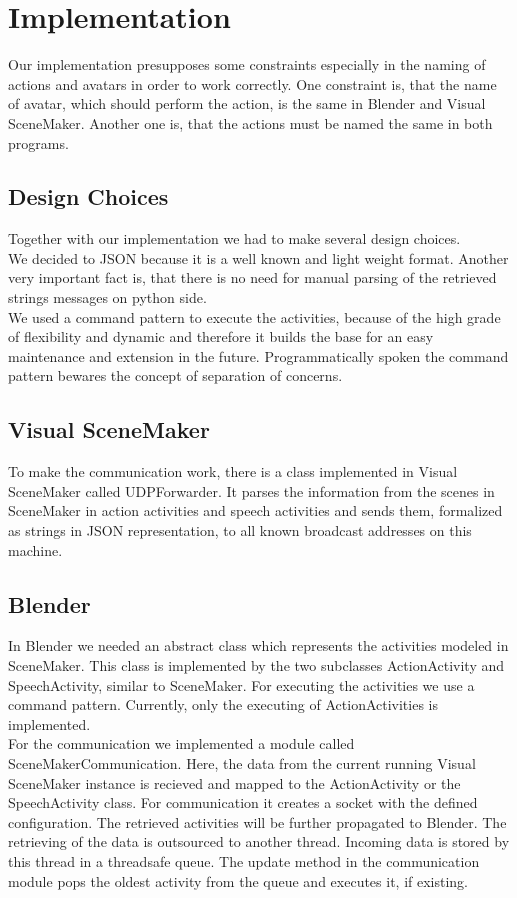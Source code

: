 \documentclass[
10pt, %
a4paper, %
oneside,
headinclude,footinclude, %
BCOR5mm, %
]{scrartcl}
\begin{document}

\section{Implementation}
Our implementation presupposes some constraints especially in the naming of actions and avatars in order to work correctly.
One constraint is, that the name of avatar, which should perform the action, is the same in Blender and Visual SceneMaker. Another one is, that the actions must be named the same in both programs. %

\subsection{Design Choices}
Together with our implementation we had to make several design choices.\\
We decided to JSON because it is a well known and light weight format. Another very important fact is, that there is no need for manual parsing of the retrieved strings messages on python side.\\
We used a command pattern to execute the activities, because of the high grade of flexibility and dynamic and therefore it builds the base for an easy maintenance and extension in the future. Programmatically spoken the command pattern bewares the concept of separation of concerns.

\subsection{Visual SceneMaker}
To make the communication work, there is a class implemented in Visual SceneMaker called UDPForwarder. It parses the information from the scenes in SceneMaker in action activities and speech activities and sends them, formalized as strings in JSON representation, to all known broadcast addresses on this machine. 

\subsection{Blender}
In Blender we needed an abstract class which represents the activities modeled in SceneMaker. This class is implemented by the two subclasses  ActionActivity and SpeechActivity, similar to SceneMaker. For executing the activities we use a command pattern. Currently, only the executing of ActionActivities is implemented.\\
For the communication we implemented a module called SceneMakerCommunication. Here, the data from the current running Visual SceneMaker instance is recieved and mapped to the ActionActivity or the SpeechActivity class. For communication it creates a socket with the defined configuration. The retrieved
activities will be further propagated to Blender. The retrieving of the data is outsourced to another thread. Incoming data is stored by this thread in a threadsafe queue. The update method in the communication module pops the oldest activity from the queue and executes it, if existing.
\end{document}

